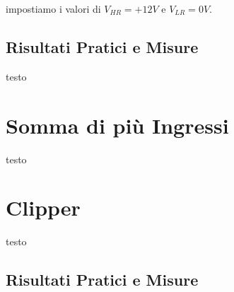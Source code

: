impostiamo i valori di $V_{HR}=+12V$ e $V_{LR}=0V$.


\subsection*{Risultati Pratici e Misure}


testo


\section{Somma di più Ingressi}


testo


\section{Clipper}


testo


\subsection*{Risultati Pratici e Misure}

